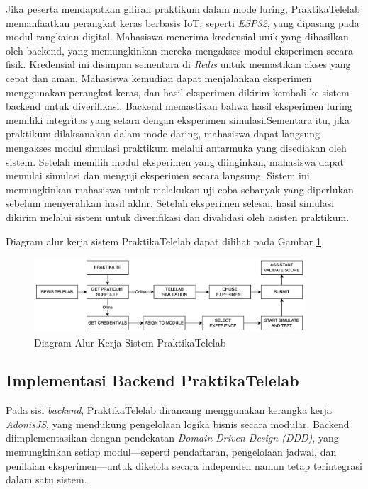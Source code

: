 Jika peserta mendapatkan giliran praktikum dalam mode luring, PraktikaTelelab memanfaatkan perangkat keras berbasis IoT, seperti \emph{ESP32}, yang dipasang pada modul rangkaian digital. Mahasiswa menerima kredensial unik yang dihasilkan oleh backend, yang memungkinkan mereka mengakses modul eksperimen secara fisik. Kredensial ini disimpan sementara di \emph{Redis} untuk memastikan akses yang cepat dan aman. Mahasiswa kemudian dapat menjalankan eksperimen menggunakan perangkat keras, dan hasil eksperimen dikirim kembali ke sistem backend untuk diverifikasi. Backend memastikan bahwa hasil eksperimen luring memiliki integritas yang setara dengan eksperimen simulasi.Sementara itu, jika praktikum dilaksanakan dalam mode daring, mahasiswa dapat langsung mengakses modul simulasi praktikum melalui antarmuka yang disediakan oleh sistem. Setelah memilih modul eksperimen yang diinginkan, mahasiswa dapat memulai simulasi dan menguji eksperimen secara langsung. Sistem ini memungkinkan mahasiswa untuk melakukan uji coba sebanyak yang diperlukan sebelum menyerahkan hasil akhir. Setelah eksperimen selesai, hasil simulasi dikirim melalui sistem untuk diverifikasi dan divalidasi oleh asisten praktikum.

Diagram alur kerja sistem PraktikaTelelab dapat dilihat pada Gambar \ref{fig:telelab_flow}.

\begin{figure}[H]
\centering
\includegraphics[width=0.9\textwidth]{gambar/telelab.png}
\caption{Diagram Alur Kerja Sistem PraktikaTelelab}
\label{fig:telelab_flow}
\end{figure}

\subsection{Implementasi Backend PraktikaTelelab}
Pada sisi \emph{backend}, PraktikaTelelab dirancang menggunakan kerangka kerja \emph{AdonisJS}, yang mendukung pengelolaan logika bisnis secara modular. Backend diimplementasikan dengan pendekatan \emph{Domain-Driven Design (DDD)}, yang memungkinkan setiap modul—seperti pendaftaran, pengelolaan jadwal, dan penilaian eksperimen—untuk dikelola secara independen namun tetap terintegrasi dalam satu sistem. 

